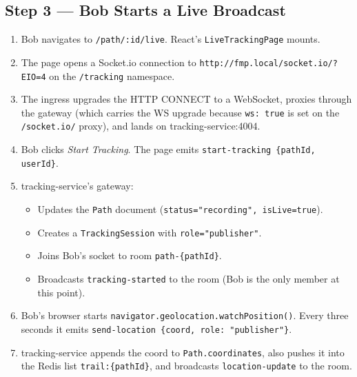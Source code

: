 \documentclass[11pt,a4paper]{article}
\begin{document}
\subsection{Step 3 — Bob Starts a Live Broadcast}
\begin{enumerate}[leftmargin=*]
  \item Bob navigates to \texttt{/path/:id/live}.  React's
        \texttt{LiveTrackingPage} mounts.
  \item The page opens a Socket.io connection to
        \texttt{http://fmp.local/socket.io/?EIO=4} on the
        \texttt{/tracking} namespace.
  \item The ingress upgrades the HTTP CONNECT to a WebSocket,
        proxies through the gateway (which carries the WS upgrade
        because \texttt{ws: true} is set on the
        \texttt{/socket.io/} proxy), and lands on
        tracking-service:4004.
  \item Bob clicks \emph{Start Tracking}.  The page emits
        \texttt{start-tracking \{pathId, userId\}}.
  \item tracking-service's gateway:
        \begin{itemize}[leftmargin=*]
          \item Updates the \texttt{Path} document
                (\texttt{status="recording", isLive=true}).
          \item Creates a \texttt{TrackingSession} with
                \texttt{role="publisher"}.
          \item Joins Bob's socket to room \texttt{path-\{pathId\}}.
          \item Broadcasts \texttt{tracking-started} to the room
                (Bob is the only member at this point).
        \end{itemize}
  \item Bob's browser starts \texttt{navigator.geolocation.watchPosition()}.
        Every three seconds it emits
        \texttt{send-location \{coord, role: "publisher"\}}.
  \item tracking-service appends the coord to
        \texttt{Path.coordinates}, also pushes it into the Redis
        list \texttt{trail:\{pathId\}}, and broadcasts
        \texttt{location-update} to the room.
\end{enumerate}
\end{document}
